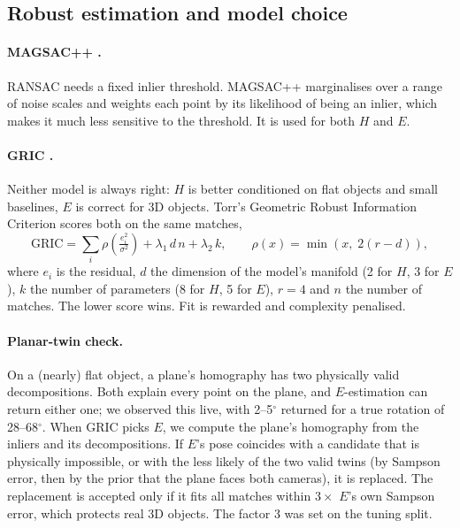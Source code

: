 \documentclass[11pt,a4paper]{article}
\begin{document}
\subsection{Robust estimation and model choice}

\paragraph{MAGSAC++ \cite{magsac}.} RANSAC needs a fixed inlier threshold. MAGSAC++
marginalises over a range of noise scales and weights each point by its likelihood of being an
inlier, which makes it much less sensitive to the threshold. It is used for both $H$ and $E$.

\paragraph{GRIC \cite{gric}.} Neither model is always right: $H$ is better conditioned on flat
objects and small baselines, $E$ is correct for 3D objects. Torr's Geometric Robust Information
Criterion scores both on the same matches,
\begin{equation}
  \mathrm{GRIC} = \sum_i \rho\!\left(\tfrac{e_i^2}{\sigma^2}\right) + \lambda_1\, d\, n + \lambda_2\, k,
  \qquad \rho(x) = \min(x,\; 2(r-d)),
\end{equation}
where $e_i$ is the residual, $d$ the dimension of the model's manifold (2 for $H$, 3 for $E$), $k$
the number of parameters (8 for $H$, 5 for $E$), $r=4$ and $n$ the number of matches. The
lower score wins. Fit is rewarded and complexity penalised.

\paragraph{Planar-twin check.} On a (nearly) flat object, a plane's homography has two physically
valid decompositions. Both explain every point on the plane, and $E$-estimation can return
either one; we observed this live, with 2--5$^\circ$ returned for a true rotation of 28--68$^\circ$. When GRIC
picks $E$, we compute the plane's homography from the inliers and its decompositions. If $E$'s
pose coincides with a candidate that is physically impossible, or with the less likely of the
two valid twins (by Sampson error, then by the prior that the plane faces both cameras), it is replaced.
The replacement is accepted only if it fits all matches within $3\times$ $E$'s own Sampson error,
which protects real 3D objects. The factor 3 was set on the tuning split.
\end{document}
